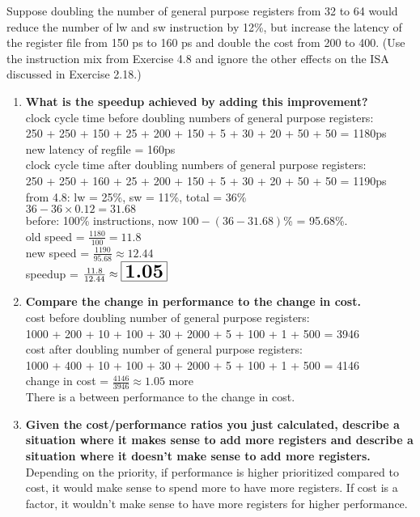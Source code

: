 \documentclass{article}
\begin{document}
    \noindent Suppose doubling the number of general purpose registers from 32 to 64 would reduce the number of lw and sw instruction by 12\%, but increase the latency of the register file from 150 ps to 160 ps and double the cost from 200 to 400. (Use the instruction mix from Exercise 4.8 and ignore the other effects on the ISA discussed in Exercise 2.18.)
    \begin{enumerate}[label=(\alph*)]
        \item \textbf{What is the speedup achieved by adding this improvement?}
        \\ 
        clock cycle time before doubling numbers of general purpose registers:\\
        250 + 250 + 150 + 25 + 200 + 150 + 5 + 30 + 20 + 50 + 50 = 1180ps\\
        new latency of regfile = 160ps\\
        clock cycle time after doubling numbers of general purpose registers:\\
        250 + 250 + 160 + 25 + 200 + 150 + 5 + 30 + 20 + 50 + 50 = 1190ps\\
        from 4.8: lw = 25\%, sw = 11\%, total = 36\%\\
        $36 - 36 \times 0.12 = 31.68$\\
        before: 100\% instructions, now $100 - (36 - 31.68)$\% = 95.68\%.\\
        old speed = $\frac{1180}{100} = 11.8$\\
        new speed = $\frac{1190}{95.68} \approx 12.44$\\
        speedup = $\frac{11.8}{12.44} \approx \boxed{\textbf{\LARGE 1.05}}$
        \item \textbf{Compare the change in performance to the change in cost.}
        \\
        cost before doubling number of general purpose registers:\\
        1000 + 200 + 10 + 100 + 30 + 2000 + 5 + 100 + 1 + 500 = 3946\\
        cost after doubling number of general purpose registers:\\
        1000 + 400 + 10 + 100 + 30 + 2000 + 5 + 100 + 1 + 500 = 4146\\
        change in cost = $\frac{4146}{3946} \approx 1.05$ more\\
        There is a  between performance to the change in cost.
        \item \textbf{Given the cost/performance ratios you just calculated, describe a situation where it makes sense to add more registers and describe a situation where it doesn't make sense to add more registers.}
        \\
        Depending on the priority, if performance is higher prioritized compared to cost, it would make sense to spend more to have more registers. If cost is a factor, it wouldn't make sense to have more registers for higher performance.
    \end{enumerate}
\end{document}
